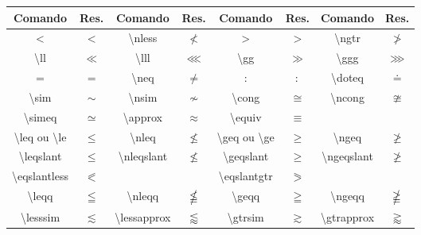 % 
% 
% 
% 
% 
\begin{tabular}{cc|cc|cc|cc}
    \hline
    Comando & Res. & Comando & Res. & Comando & Res. & Comando & Res. \\ \hline
    \textless & $<$ & \textbackslash\textsf{nless} & $\nless$ & \textgreater & $>$ & \textbackslash\textsf{ngtr} & $\ngtr$ \\ 
    \textbackslash\textsf{ll} & $\ll$ & \textbackslash\textsf{lll} & $\lll$ & \textbackslash\textsf{gg} & $\gg$ & \textbackslash\textsf{ggg} & $\ggg$ \\ 
    = & $=$ & \textbackslash\textsf{neq} & $\neq$ & : & $:$ &  \textbackslash\textsf{doteq} & $\doteq$  \\ 
    \textbackslash\textsf{sim} & $\sim$ & \textbackslash\textsf{nsim} & $\nsim$ & \textbackslash\textsf{cong} & $\cong$ &  \textbackslash\textsf{ncong} & $\ncong$  \\ 
    \textbackslash\textsf{simeq} & $\simeq$ & \textbackslash\textsf{approx} & $\approx$ &  \textbackslash\textsf{equiv} & $\equiv$ & & \\
    \textbackslash\textsf{leq} ou \textbackslash\textsf{le} & $\leq$ & \textbackslash\textsf{nleq} & $\nleq$ & \textbackslash\textsf{geq} ou \textbackslash\textsf{ge} & $\geq$ & \textbackslash\textsf{ngeq} & $\ngeq$ \\ 
    \textbackslash\textsf{leqslant} & $\leqslant$ &  \textbackslash\textsf{nleqslant} & $\nleqslant$  & \textbackslash\textsf{geqslant} & $\geqslant$ & \textbackslash\textsf{ngeqslant} & $\ngeqslant$ \\ 
    \textbackslash\textsf{eqslantless}  & $\eqslantless$  &  &  & \textbackslash\textsf{eqslantgtr} & $\eqslantgtr$ &  &  \\ 
    \textbackslash\textsf{leqq} & $\leqq$ & \textbackslash\textsf{nleqq} & $\nleqq$ & \textbackslash\textsf{geqq} & $\geqq$ & \textbackslash\textsf{ngeqq} & $\ngeqq$ \\ 
    \textbackslash\textsf{lesssim}  & $\lesssim$  & \textbackslash\textsf{lessapprox}  & $\lessapprox$ & \textbackslash\textsf{gtrsim} & $\gtrsim$ & \textbackslash\textsf{gtrapprox} & $\gtrapprox$ \\ 

\end{tabular}
